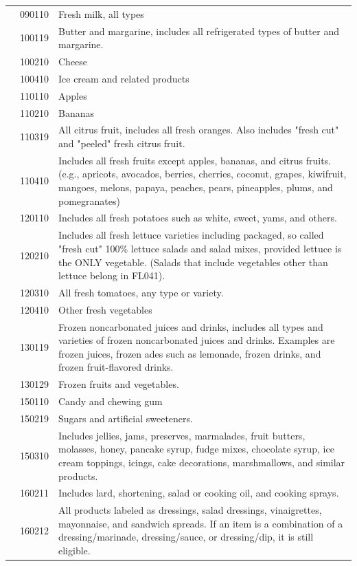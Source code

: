 \documentclass[
]{agujournal2019}
\begin{document}
\begin{table}
{\begin{tabular*}{\linewidth}{@{\extracolsep{\fill}}l|rl}
 & 090110 & Fresh milk, all types \\ 
 & 100119 & Butter and margarine, includes all refrigerated types of butter and margarine. \\ 
 & 100210 & Cheese \\ 
 & 100410 & Ice cream and related products \\ 
 & 110110 & Apples \\ 
 & 110210 & Bananas \\ 
 & 110319 & All citrus fruit, includes all fresh oranges. Also includes "fresh cut" and "peeled" fresh citrus fruit. \\ 
 & 110410 & Includes all fresh fruits except apples, bananas, and citrus fruits. (e.g., apricots, avocados, berries, cherries, coconut, grapes, kiwifruit, mangoes, melons, papaya, peaches, pears, pineapples, plums, and pomegranates) \\ 
 & 120110 & Includes all fresh potatoes such as white, sweet, yams, and others. \\ 
 & 120210 & Includes all fresh lettuce varieties including packaged, so called "fresh cut" 100\% lettuce salads and salad mixes, provided lettuce is the ONLY vegetable. (Salads that include vegetables other than lettuce belong in FL041). \\ 
 & 120310 & All fresh tomatoes, any type or variety. \\ 
 & 120410 & Other fresh vegetables \\ 
 & 130119 & Frozen noncarbonated juices and drinks, includes all types and varieties of frozen noncarbonated juices and drinks. Examples are frozen juices, frozen ades such as lemonade, frozen drinks, and frozen fruit-flavored drinks. \\ 
 & 130129 & Frozen fruits and vegetables. \\ 
 & 150110 & Candy and chewing gum \\ 
 & 150219 & Sugars and artificial sweeteners. \\ 
 & 150310 & Includes jellies, jams, preserves, marmalades, fruit butters, molasses, honey, pancake syrup, fudge mixes, chocolate syrup, ice cream toppings, icings, cake decorations, marshmallows, and similar products. \\ 
 & 160211 & Includes lard, shortening, salad or cooking oil, and cooking sprays. \\ 
 & 160212 & All products labeled as dressings, salad dressings, vinaigrettes, mayonnaise, and sandwich spreads. If an item is a combination of a dressing/marinade, dressing/sauce, or dressing/dip, it is still eligible. \\ 

\end{tabular*}}
\end{table}
\end{document}
